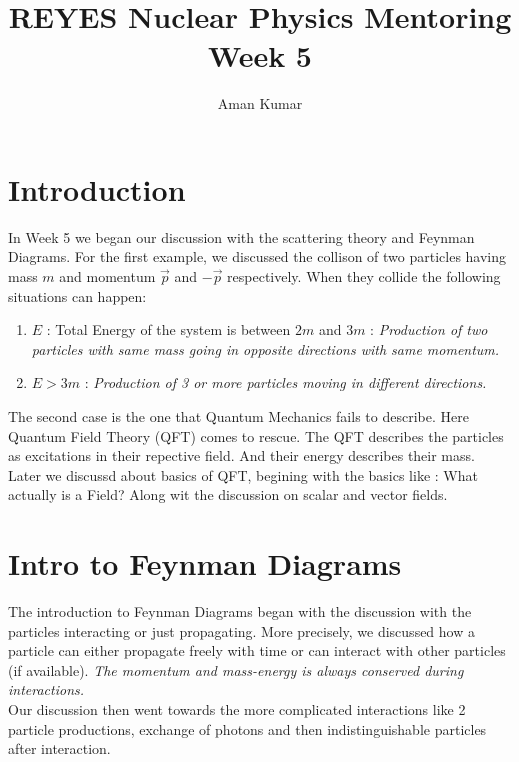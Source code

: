 \documentclass[a4paper]{article}
\title{REYES Nuclear Physics Mentoring Week 5}
\author{Aman Kumar}
\begin{document}
\maketitle
\section{Introduction}
In Week 5 we began our discussion with the scattering theory and Feynman Diagrams. For the first example, we discussed the collison of two
particles having mass $m$ and momentum $\vec{p}$ and $-\vec{p}$ respectively. When they collide the following situations can happen: 
\begin{enumerate}
    \item $E$ : Total Energy of the system is between $2m$ and $3m$ : \emph{Production of two particles with same mass going in opposite directions with same momentum.}
    \item $E > 3m$ : \emph{Production of 3 or more particles moving in different directions.}
\end{enumerate}

The second case is the one that Quantum Mechanics fails to describe. Here Quantum Field Theory (QFT) comes to rescue. The QFT describes the particles as excitations in 
their repective field. And their energy describes their mass. 
\\
Later we discussd about basics of QFT, begining with the basics like : What actually is a Field? Along wit the discussion on scalar and vector fields.

\section{Intro to Feynman Diagrams}
The introduction to Feynman Diagrams began with the discussion with the particles interacting or just propagating. More precisely, we discussed how a particle can 
either propagate freely with time or can interact with other particles (if available). \emph{The momentum and mass-energy is always conserved during interactions.}
\\
Our discussion then went towards the more complicated interactions like 2 particle productions, exchange of photons and then indistinguishable particles after interaction.
\end{document}
